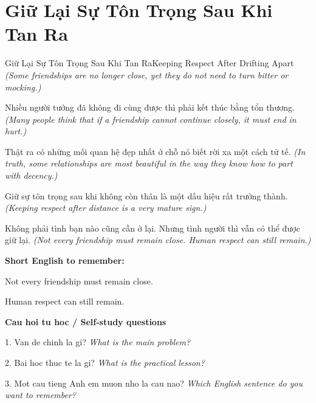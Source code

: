 \section{Giữ Lại Sự Tôn Trọng Sau Khi Tan Ra}
\begin{truyen}{Giữ Lại Sự Tôn Trọng Sau Khi Tan Ra}{Keeping Respect After Drifting Apart}
\textit{(Some friendships are no longer close, yet they do not need to turn bitter or mocking.)}

Nhiều người tưởng đã không đi cùng được thì phải kết thúc bằng tổn thương.
\textit{(Many people think that if a friendship cannot continue closely, it must end in hurt.)}

Thật ra có những mối quan hệ đẹp nhất ở chỗ nó biết rời xa một cách tử tế.
\textit{(In truth, some relationships are most beautiful in the way they know how to part with decency.)}

Giữ sự tôn trọng sau khi không còn thân là một dấu hiệu rất trưởng thành.
\textit{(Keeping respect after distance is a very mature sign.)}

\end{truyen}

\begin{baihoc}
Không phải tình bạn nào cũng cần ở lại. Nhưng tình người thì vẫn có thể được giữ lại.
\textit{(Not every friendship must remain close. Human respect can still remain.)}
\end{baihoc}

\begin{ghinhoanh}
\textbf{Short English to remember:}

Not every friendship must remain close.

Human respect can still remain.

\end{ghinhoanh}

\begin{tuhocnhanh}
\textbf{Cau hoi tu hoc / Self-study questions}

1. Van de chinh la gi? \textit{What is the main problem?}

2. Bai hoc thuc te la gi? \textit{What is the practical lesson?}

3. Mot cau tieng Anh em muon nho la cau nao? \textit{Which English sentence do you want to remember?}
\end{tuhocnhanh}
